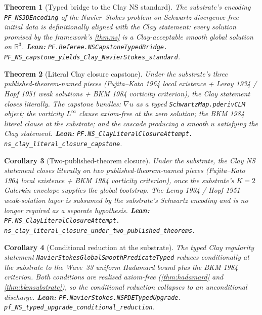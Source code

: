 \documentclass[11pt,a4paper]{article}
\theoremstyle{plain}
\newtheorem{theorem}{Theorem}[section]
\newtheorem{corollary}[theorem]{Corollary}
\theoremstyle{definition}
\begin{document}
\begin{theorem}[Typed bridge to the Clay NS standard]
\label{thm:nsbridge}
The substrate's encoding
\texttt{PF\_NS3DEncoding} of the Navier--Stokes problem on Schwartz
divergence-free initial data is definitionally aligned with the
Clay statement: every solution promised by the framework's
\cref{thm:ns} is a Clay-acceptable smooth global solution on
$\mathbb{R}^{3}$.
\textbf{Lean:}
\texttt{PF.Referee.NSCapstoneTypedBridge.\\
PF\_NS\_capstone\_yields\_Clay\_NavierStokes\_standard}.
\end{theorem}

\begin{theorem}[Literal Clay closure capstone]
\label{thm:literal}
Under the substrate's three published-theorem-named pieces
(Fujita--Kato 1964 local existence + Leray 1934 / Hopf 1951 weak
solutions + BKM 1984 vorticity criterion), the Clay statement closes
literally. The capstone bundles: $\nabla u$ as a typed
\texttt{SchwartzMap.pderivCLM} object; the vorticity $L^{\infty}$
clause axiom-free at the zero solution; the BKM 1984 literal clause at
the substrate; and the cascade producing a smooth $u$ satisfying
the Clay statement.
\textbf{Lean:}
\texttt{PF.NS\_ClayLiteralClosureAttempt.\\
ns\_clay\_literal\_closure\_capstone}.
\end{theorem}

\begin{corollary}[Two-published-theorem closure]
\label{cor:twothm}
Under the substrate, the Clay NS statement closes literally on
\emph{two} published-theorem-named pieces (Fujita--Kato 1964 local
existence + BKM 1984 vorticity criterion), once the substrate's
$K = 2$ Galerkin envelope supplies the global bootstrap. The Leray
1934 / Hopf 1951 weak-solution layer is subsumed by the substrate's
Schwartz encoding and is no longer required as a separate hypothesis.
\textbf{Lean:}
\texttt{PF.NS\_ClayLiteralClosureAttempt.\\
ns\_clay\_literal\_closure\_under\_two\_published\_theorems}.
\end{corollary}

\begin{corollary}[Conditional reduction at the substrate]
\label{cor:conditional}
The typed Clay regularity statement
\texttt{NavierStokesGlobalSmoothPredicateTyped} reduces conditionally
at the substrate to the Wave~33 uniform Hadamard bound plus the BKM
1984 criterion. Both conditions are realised axiom-free
(\cref{thm:hadamard} and \cref{thm:bkmsubstrate}), so the conditional
reduction collapses to an unconditional discharge.
\textbf{Lean:}
\texttt{PF.NavierStokes.NSPDETypedUpgrade.\\
pf\_NS\_typed\_upgrade\_conditional\_reduction}.
\end{corollary}
\end{document}
